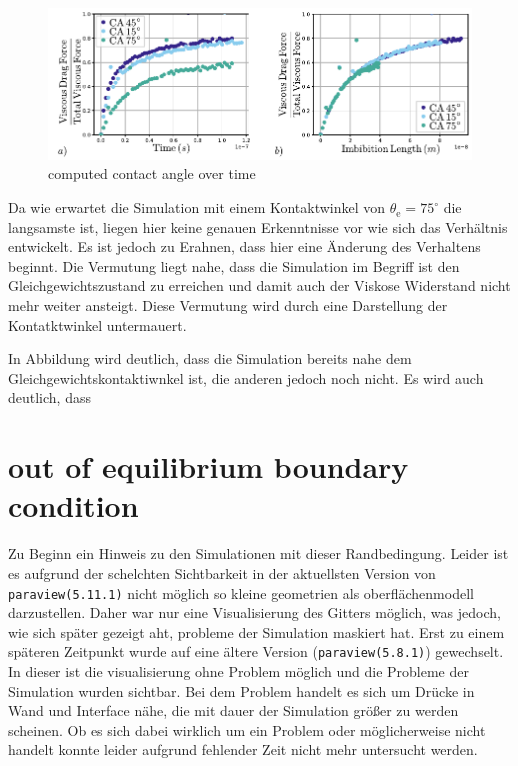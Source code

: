 \begin{figure}[h]
    \centering
    \includegraphics[width=.8\textwidth]{Pictures/CA_Forces_Variation.pdf}
    \caption{computed contact angle over time }
    \label{fig: CA_Forces} 
\end{figure}
Da wie erwartet die Simulation mit einem Kontaktwinkel von $\theta_{\mathrm{e}}=75^{\circ}$ die langsamste ist, liegen hier keine genauen Erkenntnisse vor wie sich das Verhältnis entwickelt. Es ist jedoch zu Erahnen, dass hier eine Änderung des Verhaltens beginnt. Die Vermutung liegt nahe, dass die Simulation im Begriff ist den Gleichgewichtszustand zu erreichen und damit auch der Viskose Widerstand nicht mehr weiter ansteigt. Diese Vermutung wird durch eine Darstellung der Kontatktwinkel untermauert. 

In Abbildung  wird deutlich, dass die Simulation bereits nahe dem Gleichgewichtskontaktiwnkel ist, die anderen jedoch noch nicht. Es wird auch deutlich, dass 



\section{out of equilibrium boundary condition}
\label{sec: outOfEquilibriumBoundaryCondition}
Zu Beginn ein Hinweis zu den Simulationen mit dieser Randbedingung. Leider ist es aufgrund der schelchten Sichtbarkeit in der aktuellsten Version von \texttt{paraview(5.11.1)} nicht möglich so kleine geometrien als oberflächenmodell darzustellen. Daher war nur eine Visualisierung des Gitters möglich, was jedoch, wie sich später gezeigt aht, probleme der Simulation maskiert hat. Erst zu einem späteren Zeitpunkt wurde auf eine ältere Version (\texttt{paraview(5.8.1)}) gewechselt. In dieser ist die visualisierung ohne Problem möglich und die Probleme der Simulation wurden sichtbar. Bei dem Problem handelt es sich um Drücke in Wand und Interface nähe, die mit dauer der Simulation größer zu werden scheinen. Ob es sich dabei wirklich um ein Problem oder möglicherweise nicht handelt konnte leider aufgrund fehlender Zeit nicht mehr untersucht werden. 

